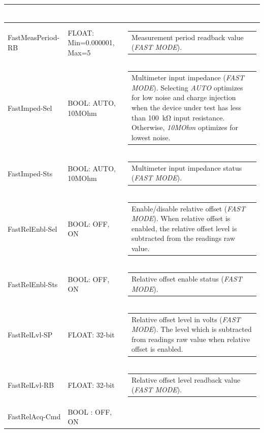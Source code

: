 \documentclass[openany]{article}
\begin{document}
\begin{longtable}{| m{3.0cm} m{4.5cm} m{7.0cm} |}
\begin{tabular}{@{}m{6cm}@{}}
						\end{tabular} \\ \hline
		FastMeasPeriod-RB & FLOAT: Min=0.000001, Max=5 & \begin{tabular}{@{}m{6cm}@{}}
	    					Measurement period readback value (\emph{FAST MODE}).
						\end{tabular} \\ \hline
		FastImped-Sel & BOOL: AUTO, 10MOhm & \begin{tabular}{@{}m{6cm}@{}}
	    					Multimeter input impedance (\emph{FAST MODE}). Selecting \emph{AUTO} optimizes for low noise and charge injection when the device under test has less than \SI{100}{\kohm} input resistance. Otherwise, \emph{10MOhm} optimizes for lowest noise.
						\end{tabular} \\ \hline
		FastImped-Sts & BOOL: AUTO, 10MOhm & \begin{tabular}{@{}m{6cm}@{}}
	    					Multimeter input impedance status (\emph{FAST MODE}).
						\end{tabular} \\ \hline
		FastRelEnbl-Sel & BOOL: OFF, ON & \begin{tabular}{@{}m{6cm}@{}}
	    					Enable/disable relative offset (\emph{FAST MODE}). When relative offset is enabled, the relative offset level is subtracted from the readings raw value.
						\end{tabular} \\ \hline
		FastRelEnbl-Sts & BOOL: OFF, ON & \begin{tabular}{@{}m{6cm}@{}}
	    					Relative offset enable status (\emph{FAST MODE}).
						\end{tabular} \\ \hline
		FastRelLvl-SP & FLOAT: 32-bit & \begin{tabular}{@{}m{6cm}@{}}
	    					Relative offset level in volts (\emph{FAST MODE}). The level which is subtracted from readings raw value when relative offset is enabled.
						\end{tabular} \\ \hline
		FastRelLvl-RB & FLOAT: 32-bit & \begin{tabular}{@{}m{6cm}@{}}
	    					Relative offset level readback value (\emph{FAST MODE}).
						\end{tabular} \\ \hline
		FastRelAcq-Cmd & BOOL : OFF, ON & \begin{tabular}{@{}m{6cm}@{}}

\end{tabular}
\end{longtable}
\end{document}
